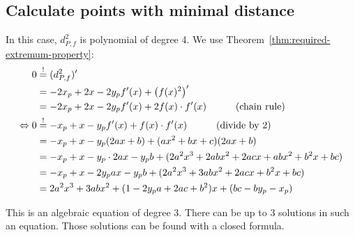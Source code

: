 \documentclass[a4paper]{scrartcl}
\theoremstyle{break}
\theoremstyle{nonumberplain}
\begin{document}
\subsection{Calculate points with minimal distance}
In this case, $d_{P,f}^2$ is polynomial of degree 4. 
We use Theorem~\ref{thm:required-extremum-property}:\nobreak
\begin{align}
    0     &\overset{!}{=} (d_{P,f}^2)'\\
          &= -2 x_p + 2x -2y_p f'(x) + \left (f(x)^2 \right )'\\
          &= -2 x_p + 2x -2y_p f'(x) + 2 f(x) \cdot f'(x) \rlap{\hspace*{3em}(chain rule)}\label{eq:minimizingFirstDerivative}\\
\Leftrightarrow 0 &\overset{!}{=} -x_p + x -y_p f'(x) + f(x) \cdot f'(x) \rlap{\hspace*{3em}(divide by 2)}\label{eq:minimizingFirstDerivative}\\
          &= -x_p + x -y_p (2ax+b) + (ax^2+bx+c)(2ax+b)\\
          &= -x_p + x -y_p \cdot 2ax- y_p b + (2 a^2 x^3+2 a b x^2+2 a c x+ab x^2+b^2 x+bc)\\
          &= -x_p + x -2y_p ax- y_p b + (2a^2 x^3 + 3 ab x^2 + 2acx + b^2 x + bc)\\
          &= 2a^2 x^3 + 3 ab x^2 + (1 -2y_p a+ 2ac + b^2)x +(bc-by_p-x_p)\label{eq:quadratic-derivative-eq-0}
\end{align}



This is an algebraic equation of degree 3.
There can be up to 3 solutions in such an equation. Those solutions
can be found with a closed formula.

\end{document}
